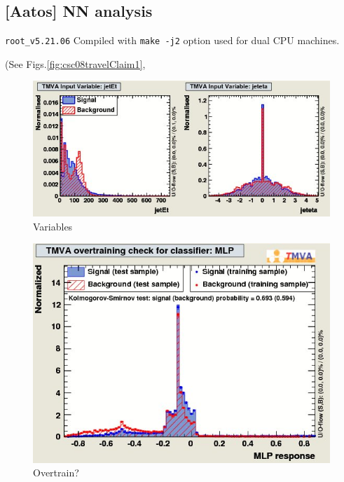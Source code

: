 \subsection{[Aatos] NN analysis}

{\tt root\_v5.21.06}
Compiled with {\tt make -j2} option used for dual CPU machines.


(See Figs.\ref{fig:csc08travelClaim1}, 
\begin{figure}[h]
\begin{center}
\includegraphics[width=1.0\textwidth]{images/variables_c1.jpg}
\caption{Variables}
\label{fig:variables_c1}
\end{center}
\end{figure}



\begin{figure}[h]
\begin{center}
\includegraphics[width=1.0\textwidth]{images/overtrain_MLP.jpg}
\caption{Overtrain?}
\label{fig:overtrainmlp}
\end{center}
\end{figure}

